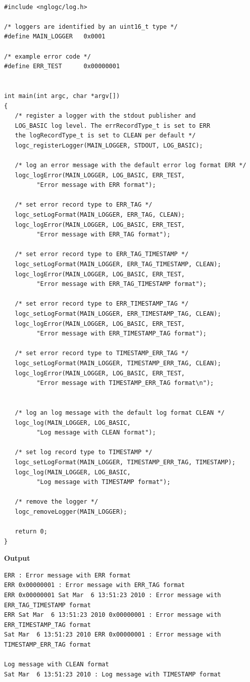 \documentclass[a4paper, titlepage, 11pt]{article}
\begin{document}
\begin{verbatim}

#include <nglogc/log.h>

/* loggers are identified by an uint16_t type */
#define MAIN_LOGGER   0x0001

/* example error code */
#define ERR_TEST      0x00000001


int main(int argc, char *argv[])
{
   /* register a logger with the stdout publisher and
   LOG_BASIC log level. The errRecordType_t is set to ERR
   the logRecordType_t is set to CLEAN per default */
   logc_registerLogger(MAIN_LOGGER, STDOUT, LOG_BASIC);

   /* log an error message with the default error log format ERR */
   logc_logError(MAIN_LOGGER, LOG_BASIC, ERR_TEST,
         "Error message with ERR format");

   /* set error record type to ERR_TAG */
   logc_setLogFormat(MAIN_LOGGER, ERR_TAG, CLEAN);
   logc_logError(MAIN_LOGGER, LOG_BASIC, ERR_TEST,
         "Error message with ERR_TAG format");

   /* set error record type to ERR_TAG_TIMESTAMP */
   logc_setLogFormat(MAIN_LOGGER, ERR_TAG_TIMESTAMP, CLEAN);
   logc_logError(MAIN_LOGGER, LOG_BASIC, ERR_TEST,
         "Error message with ERR_TAG_TIMESTAMP format");

   /* set error record type to ERR_TIMESTAMP_TAG */
   logc_setLogFormat(MAIN_LOGGER, ERR_TIMESTAMP_TAG, CLEAN);
   logc_logError(MAIN_LOGGER, LOG_BASIC, ERR_TEST,
         "Error message with ERR_TIMESTAMP_TAG format");

   /* set error record type to TIMESTAMP_ERR_TAG */
   logc_setLogFormat(MAIN_LOGGER, TIMESTAMP_ERR_TAG, CLEAN);
   logc_logError(MAIN_LOGGER, LOG_BASIC, ERR_TEST,
         "Error message with TIMESTAMP_ERR_TAG format\n");


   /* log an log message with the default log format CLEAN */
   logc_log(MAIN_LOGGER, LOG_BASIC,
         "Log message with CLEAN format");

   /* set log record type to TIMESTAMP */
   logc_setLogFormat(MAIN_LOGGER, TIMESTAMP_ERR_TAG, TIMESTAMP);
   logc_log(MAIN_LOGGER, LOG_BASIC,
         "Log message with TIMESTAMP format");

   /* remove the logger */
   logc_removeLogger(MAIN_LOGGER);

   return 0;
}
\end{verbatim}

\textbf{Output}

\begin{verbatim}
ERR : Error message with ERR format
ERR 0x00000001 : Error message with ERR_TAG format
ERR 0x00000001 Sat Mar  6 13:51:23 2010 : Error message with ERR_TAG_TIMESTAMP format
ERR Sat Mar  6 13:51:23 2010 0x00000001 : Error message with ERR_TIMESTAMP_TAG format
Sat Mar  6 13:51:23 2010 ERR 0x00000001 : Error message with TIMESTAMP_ERR_TAG format

Log message with CLEAN format
Sat Mar  6 13:51:23 2010 : Log message with TIMESTAMP format



\end{verbatim}
\end{document}
